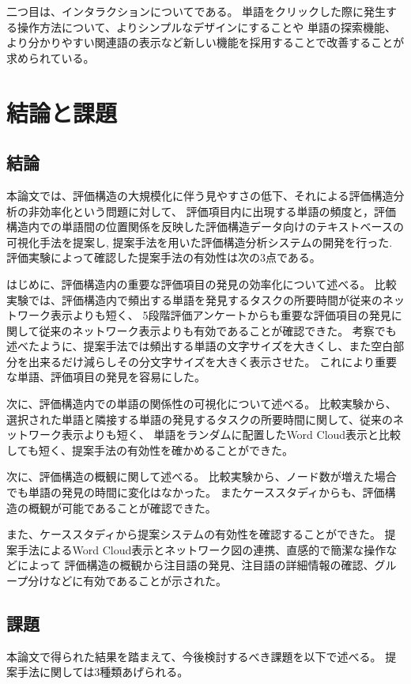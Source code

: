 \documentclass[syuuron]{kuee}
\begin{document}
		二つ目は、インタラクションについてである。
		単語をクリックした際に発生する操作方法について、よりシンプルなデザインにすることや
		単語の探索機能、より分かりやすい関連語の表示など新しい機能を採用することで改善することが求められている。

\chapter{結論と課題}
	\section{結論}
		本論文では、評価構造の大規模化に伴う見やすさの低下、それによる評価構造分析の非効率化という問題に対して、
		評価項目内に出現する単語の頻度と，評価構造内での単語間の位置関係を反映した評価構造データ向けのテキストベースの可視化手法を提案し, 
		提案手法を用いた評価構造分析システムの開発を行った. 
		評価実験によって確認した提案手法の有効性は次の3点である。
		
		はじめに、評価構造内の重要な評価項目の発見の効率化について述べる。
		比較実験では、評価構造内で頻出する単語を発見するタスクの所要時間が従来のネットワーク表示よりも短く、
		5段階評価アンケートからも重要な評価項目の発見に関して従来のネットワーク表示よりも有効であることが確認できた。
		考察でも述べたように、提案手法では頻出する単語の文字サイズを大きくし、また空白部分を出来るだけ減らしその分文字サイズを大きく表示させた。
		これにより重要な単語、評価項目の発見を容易にした。
		
		次に、評価構造内での単語の関係性の可視化について述べる。
		比較実験から、選択された単語と隣接する単語の発見するタスクの所要時間に関して、従来のネットワーク表示よりも短く、
		単語をランダムに配置したWord Cloud表示と比較しても短く、提案手法の有効性を確かめることができた。
		
		次に、評価構造の概観に関して述べる。
		比較実験から、ノード数が増えた場合でも単語の発見の時間に変化はなかった。
		またケーススタディからも、評価構造の概観が可能であることが確認できた。
		
		また、ケーススタディから提案システムの有効性を確認することができた。
		提案手法によるWord Cloud表示とネットワーク図の連携、直感的で簡潔な操作などによって
		評価構造の概観から注目語の発見、注目語の詳細情報の確認、グループ分けなどに有効であることが示された。		
		
	\section{課題}
		本論文で得られた結果を踏まえて、今後検討するべき課題を以下で述べる。
		提案手法に関しては3種類あげられる。
		
\end{document}
